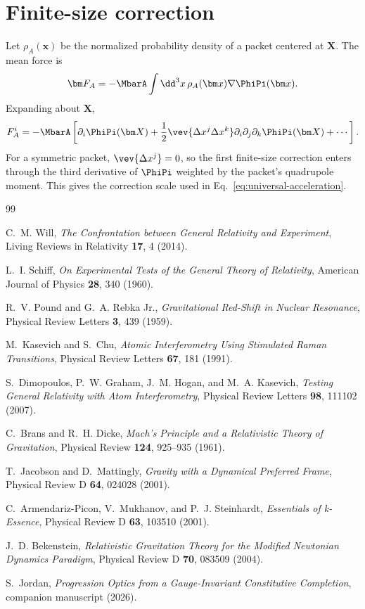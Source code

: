 \documentclass[12pt]{article}
\begin{document}
\section{Finite-size correction}

Let \(\rho_A(\bm x)\) be the normalized probability density of a packet centered at \(\bm X\). The mean force is
\begin{equation}
    \bm F_A=-\MbarA\int \dd^3x\,\rho_A(\bm x)\nabla\PhiPi(\bm x).
    \label{eq:mean-force}
\end{equation}
Expanding about \(\bm X\),
\begin{equation}
    F_A^i=-\MbarA\left[\partial_i\PhiPi(\bm X)
    +\frac{1}{2}\vev{\Delta x^j\Delta x^k}\partial_i\partial_j\partial_k\PhiPi(\bm X)+\cdots\right].
    \label{eq:finite-force}
\end{equation}
For a symmetric packet, \(\vev{\Delta x^j}=0\), so the first finite-size correction enters through the third derivative of \(\PhiPi\) weighted by the packet's quadrupole moment. This gives the correction scale used in Eq.~\eqref{eq:universal-acceleration}.

\begin{thebibliography}{99}

C.~M. Will,
\emph{The Confrontation between General Relativity and Experiment},
Living Reviews in Relativity \textbf{17}, 4 (2014).

L.~I. Schiff,
\emph{On Experimental Tests of the General Theory of Relativity},
American Journal of Physics \textbf{28}, 340 (1960).

R.~V. Pound and G.~A. Rebka Jr.,
\emph{Gravitational Red-Shift in Nuclear Resonance},
Physical Review Letters \textbf{3}, 439 (1959).

M.~Kasevich and S.~Chu,
\emph{Atomic Interferometry Using Stimulated Raman Transitions},
Physical Review Letters \textbf{67}, 181 (1991).

S.~Dimopoulos, P.~W. Graham, J.~M. Hogan, and M.~A. Kasevich,
\emph{Testing General Relativity with Atom Interferometry},
Physical Review Letters \textbf{98}, 111102 (2007).

C.~Brans and R.~H. Dicke,
\emph{Mach's Principle and a Relativistic Theory of Gravitation},
Physical Review \textbf{124}, 925--935 (1961).

T.~Jacobson and D.~Mattingly,
\emph{Gravity with a Dynamical Preferred Frame},
Physical Review D \textbf{64}, 024028 (2001).

C.~Armendariz-Picon, V.~Mukhanov, and P.~J. Steinhardt,
\emph{Essentials of k-Essence},
Physical Review D \textbf{63}, 103510 (2001).

J.~D. Bekenstein,
\emph{Relativistic Gravitation Theory for the Modified Newtonian Dynamics Paradigm},
Physical Review D \textbf{70}, 083509 (2004).

S.~Jordan,
\emph{Progression Optics from a Gauge-Invariant Constitutive Completion},
companion manuscript (2026).

\end{thebibliography}
\end{document}

